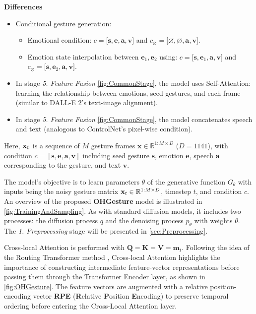 \textbf{Differences}
\begin{itemize}
	\item Conditional gesture generation:
	\begin{itemize}
		\item Emotional condition: $c = \big[ \mathbf{s}, \mathbf{e}, \mathbf{a}, \mathbf{v} \big]$ and $c_{\varnothing} = \big[ \varnothing, \varnothing, \mathbf{a}, \mathbf{v}\big]$.
		\item Emotion state interpolation between $\mathbf{e}_1, \mathbf{e}_2$ using: $c = \big[ \mathbf{s}, \mathbf{e}_1, \mathbf{a}, \mathbf{v} \big]$ and $c_{\varnothing} = \big[ \mathbf{s}, \mathbf{e}_2, \mathbf{a}, \mathbf{v} \big]$.
	\end{itemize}
	\item In stage \textit{5. Feature Fusion} \autoref{fig:CommonStage}, the model uses Self-Attention: learning the relationship between emotions, seed gestures, and each frame (similar to DALL-E 2's text-image alignment).
	\item In stage \textit{5. Feature Fusion} \autoref{fig:CommonStage}, the model concatenates speech and text (analogous to ControlNet's pixel-wise condition).
\end{itemize}

Here, $\mathbf{x}_0$ is a sequence of $M$ gesture frames $\mathbf{x} \in \mathbb{R}^{1:M \times D}$ ($D = 1141$), with condition $c = [\mathbf{s}, \mathbf{e}, \mathbf{a}, \mathbf{v}]$ including seed gesture $\mathbf{s}$, emotion $\mathbf{e}$, speech $\mathbf{a}$ corresponding to the gesture, and text $\mathbf{v}$.

The model's objective is to learn parameters $\theta$ of the generative function $G_{\theta}$ with inputs being the noisy gesture matrix $\mathbf{x}_t \in \mathbb{R}^{1:M \times D}$, timestep $t$, and condition $c$. An overview of the proposed \textbf{OHGesture} model is illustrated in \autoref{fig:TrainingAndSampling}. As with standard diffusion models, it includes two processes: the diffusion process $q$ and the denoising process $p_{\theta}$ with weights $\theta$. The \textit{1. Preprocessing} stage will be presented in \autoref{sec:Preprocessing}.


Cross-local Attention is performed with $\mathbf{Q} = \mathbf{K} = \mathbf{V} = \mathbf{m}_{t}$.
Following the idea of the Routing Transformer method \cite{roy2021efficient}, Cross-local Attention highlights the importance of constructing intermediate feature-vector representations before passing them through the Transformer Encoder layer, as shown in \autoref{fig:OHGesture}.
The feature vectors are augmented with a relative position-encoding vector \textbf{RPE} (\textbf{R}elative \textbf{P}osition \textbf{E}ncoding) to preserve temporal ordering before entering the Cross-Local Attention layer.

